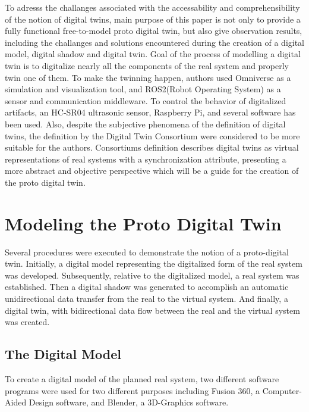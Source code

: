 \documentclass[conference]{IEEEtran}
\begin{document}
    To adresss the challanges associated with the accessability and comprehensibility of the notion of digital twins, main purpose of this paper is not only to provide a fully functional free-to-model proto digital twin, but also give observation results, including the challanges and solutions encountered during the creation of a digital model, digital shadow and digital twin. Goal of the process of modelling a digital twin is to digitalize nearly all the components of the real system and properly twin one of them.
    To make the twinning happen, authors used Omniverse as a simulation and visualization tool, 
    and ROS2(Robot Operating System)  as a sensor and communication middleware. 
    To control the behavior of digitalized artifacts, an HC-SR04 ultrasonic sensor, Raspberry Pi,
    and several software has been used. Also, despite the subjective phenomena of the definition 
    of digital twins, the definition by the Digital Twin Consortium were considered
    to be more suitable for the authors. Consortiums definition describes digital
    twins  as virtual representations of real systems with a synchronization attribute,
    presenting a more abstract and objective perspective which will be a guide for the 
    creation of the proto digital twin.

    \section{Modeling the Proto Digital Twin}\label{section:components}
    Several procedures were executed to demonstrate the notion of a proto-digital twin. 
    Initially, a digital model representing the digitalized form of the real system was developed. 
    Subsequently, relative to the digitalized model, a real system was established. 
    Then a digital shadow was generated to accomplish an automatic unidirectional data 
    transfer from the real to the virtual system. And finally, a digital twin, with 
    bidirectional data flow between the real and the virtual system was created. 

    \subsection*{The Digital Model}\label{section:digital_model}
    To create a digital model of the planned real system, two different software programs were used for two different 
    purposes including Fusion 360, a Computer-Aided Design software, and Blender, a 3D-Graphics software. 
\end{document}
